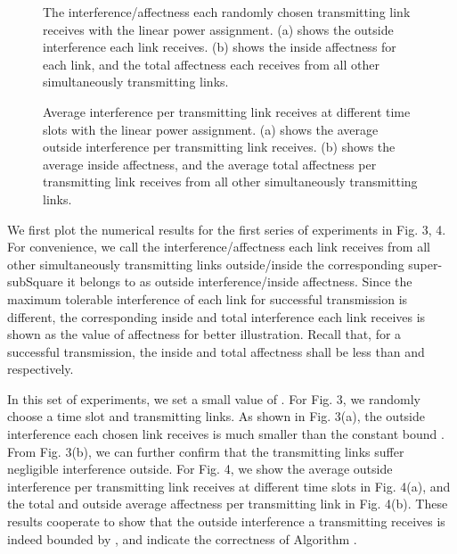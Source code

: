 \documentclass[journal]{IEEEtran}
\begin{document}
\begin{figure}[t]
    \centering
 \begin{minipage}{0.49\textwidth}
    \centering
    \hspace{0cm}
     \caption{{\small{The interference/affectness each randomly chosen transmitting link receives with the linear power assignment. (a) shows the outside interference each link receives. (b) shows the inside affectness for each link, and the total affectness each receives from all other simultaneously transmitting links.}}}
  \end{minipage}
  \hspace{0cm}
  \hfill
 \begin{minipage}{0.49\textwidth}
    \centering
  \hspace{0cm}
     \caption{{\small{Average interference per transmitting link receives at different time slots with the linear power assignment. (a) shows the average outside interference  per transmitting link receives. (b) shows the average inside affectness, and the average total affectness per transmitting link receives from all other simultaneously transmitting links.} }}
 \end{minipage}
\end{figure}
We first plot the numerical results for the first series of experiments in Fig. 3, 4. For convenience, we call the interference/affectness each link receives from all other simultaneously transmitting links outside/inside the corresponding super-subSquare it belongs to as outside interference/inside affectness. Since the maximum tolerable interference of each link for successful transmission is different, the corresponding inside and total interference each link receives is shown as the value of affectness for better illustration. Recall that, for a successful transmission, the inside and total affectness shall be less than  and  respectively.

In this set of experiments, we set  a small value of .  For Fig. 3, we randomly choose a time slot and  transmitting links. As shown in Fig. 3(a), the outside interference each chosen link receives is much smaller than the constant bound . From Fig. 3(b), we can further confirm that the transmitting links suffer negligible interference outside. For Fig. 4, we show the average outside interference per transmitting link receives at different time slots in Fig. 4(a), and the total and outside average affectness  per transmitting link in Fig. 4(b). These results cooperate to show that the outside interference a transmitting receives is indeed bounded by , and indicate the correctness of Algorithm .
\end{document}
